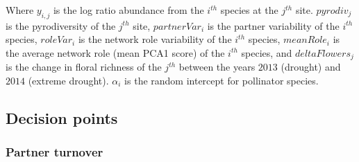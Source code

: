 \documentclass{article}\usepackage[]{graphicx}\usepackage[]{color}
\begin{document}
Where $y_{i,j}$ is the log ratio abundance from the $i^{th}$ species
at the $j^{th}$ site. $pyrodiv_j$ is the pyrodiversity of the $j^{th}$
site, $partnerVar_i$ is the partner variability of the $i^{th}$
species, $roleVar_i$ is the network role variability of the $i^{th}$
species, $meanRole_i$ is the average network role (mean PCA1 score) of
the $i^{th}$ species, and $deltaFlowers_j$ is the change in floral
richness of the $j^{th}$ between the years $2013$ (drought) and $2014$
(extreme drought).  $\alpha_i$ is the random intercept for pollinator
species.



\subsection{Decision points}
\subsubsection{Partner turnover}
\end{document}

